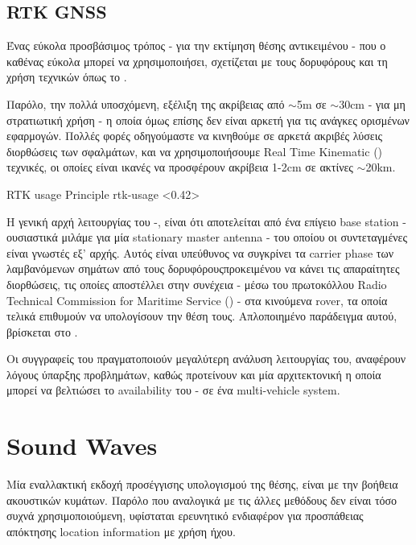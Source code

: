 \subsection{RTK GNSS}
Ένας εύκολα προσβάσιμος τρόπος - για την εκτίμηση θέσης αντικειμένου - που ο καθένας εύκολα μπορεί να χρησιμοποιήσει, σχετίζεται με τους δορυφόρους και τη χρήση  τεχνικών όπως το .

Παρόλο, την πολλά υποσχόμενη, εξέλιξη της ακρίβειας από $\sim$5m \cite{gps-accuracy}
σε $\sim$30cm \cite{superaccurate-gps} - για μη στρατιωτική χρήση -
η οποία όμως επίσης δεν είναι αρκετή για τις ανάγκες ορισμένων εφαρμογών. 
Πολλές φορές οδηγούμαστε να κινηθούμε σε αρκετά ακριβές 
λύσεις διορθώσεις των σφαλμάτων, και να χρησιμοποιήσουμε  Real Time Kinematic () \cite{rtk-gps} τεχνικές, οι οποίες είναι ικανές να προσφέρουν ακρίβεια 1-2cm σε ακτίνες $\sim$20km. 

%
{RTK usage Principle}%
{rtk-usage}%
<0.42>%

Η γενική αρχή λειτουργίας του -, είναι ότι αποτελείται από ένα επίγειο
base station - ουσιαστικά μιλάμε για μία stationary  master antenna - του οποίου οι
συντεταγμένες είναι γνωστές εξ' αρχής. Αυτός είναι υπεύθυνος να συ\-γκρί\-νει τα carrier phase των λαμβανόμενων σημάτων από τους δορυφόρους\udot προκειμένου να κάνει τις απαραίτητες διορθώσεις, τις
οποίες αποστέλλει στην συνέχεια - μέσω του πρωτοκόλλου Radio Technical Commission for Maritime Service
() - στα κινούμενα rover, τα οποία τελικά επιθυμούν να υπολογίσουν την θέση τους. Απλοποιημένο παράδειγμα αυτού, βρίσκεται στο .

Οι συγγραφείς του \cite{rtk-gps-drone-localization} πραγματοποιούν μεγαλύτερη ανάλυση λει\-του\-ργίας του, α\-να\-φέ\-ρουν λόγους ύπαρξης προβλημάτων, καθώς προτείνουν και μία αρχιτεκτονική η οποία μπορεί να βελτιώσει το availability του - σε ένα multi-vehicle system.

\section{Sound Waves} \label{sec:related-sound}
Μία εναλλακτική εκδοχή προσέγγισης υπολογισμού της θέσης, είναι με την βοήθεια ακουστικών κυμάτων. Παρόλο που αναλογικά με τις άλλες μεθόδους δεν είναι τόσο συχνά χρησιμοποιούμενη, υφίσταται ερευνητικό ενδιαφέρον για προσπάθειας α\-πό\-κτη\-σης location information με χρήση ήχου. 

